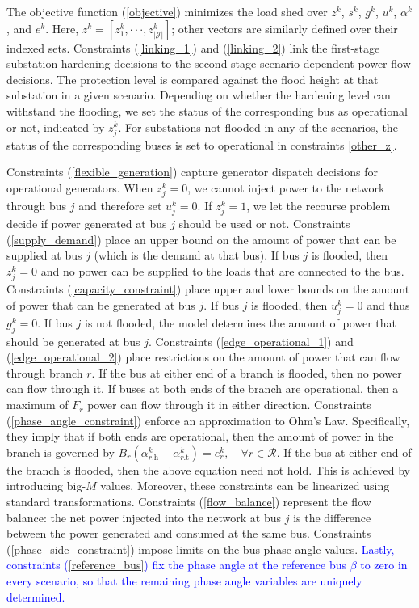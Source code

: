 \documentclass[authoryear,preprint,review,12pt]{elsarticle}\usepackage{amssymb}
\begin{document}
The objective function (\ref{objective}) minimizes the load shed over $z^k$, $s^k$, $g^k$, $u^k$, $\alpha^k$, and $e^k$. Here, $z^k = [z_1^k, \cdot \cdot \cdot, z_{|\mathcal{J}|}^k]$; other vectors are similarly defined over their indexed sets. Constraints (\ref{linking_1}) and (\ref{linking_2}) link the first-stage substation hardening decisions to the second-stage scenario-dependent power flow decisions. The protection level is compared against the flood height at that substation in a given scenario. Depending on whether the hardening level can withstand the flooding, we set the status of the corresponding bus as operational or not, indicated by $z_{j}^k$. For substations not flooded in any of the scenarios, the status of the corresponding buses is set to operational in constraints \eqref{other_z}.

Constraints (\ref{flexible_generation}) capture generator dispatch decisions for operational generators. When $z_{j}^k = 0$, we cannot inject power to the network through bus $j$ and therefore set $u_{j}^k = 0$. If $z_{j}^k = 1$, we let the recourse problem decide if power generated at bus $j$ should be used or not. Constraints (\ref{supply_demand}) place an upper bound on the amount of power that can be supplied at bus $j$ (which is the demand at that bus). If bus $j$ is flooded, then $z_{j}^k = 0$ and no power can be supplied to the loads that are connected to the bus. Constraints (\ref{capacity_constraint}) place upper and lower bounds on the amount of power that can be generated at bus $j$. If bus $j$ is flooded, then $u_{j}^k = 0$ and thus $g_{j}^k = 0$. If bus $j$ is not flooded, the model determines the amount of power that should be generated at bus $j$. Constraints (\ref{edge_operational_1}) and (\ref{edge_operational_2}) place restrictions on the amount of power that can flow through branch $r$. If the bus at either end of a branch is flooded, then no power can flow through it. If buses at both ends of the branch are operational, then a maximum of $F_r$ power can flow through it in either direction. Constraints (\ref{phase_angle_constraint}) enforce an approximation to Ohm's Law. Specifically, they imply that if both ends are operational, then the amount of power in the branch is governed by 
$B_r (\alpha_{r.\mathrm{h}}^k - \alpha_{r.\mathrm{t}}^k) = e_{r}^k, \quad \forall r \in \mathcal{R}.$ If the bus at either end of the branch is flooded, then the above equation need not hold. This is achieved by introducing big-$M$ values. Moreover, these constraints can be linearized using standard transformations. Constraints (\ref{flow_balance}) represent the flow balance: the net power injected into the network at bus $j$ is the difference between the power generated and consumed at the same bus. Constraints (\ref{phase_side_constraint}) impose limits on the bus phase angle values. 
\textcolor{blue}{Lastly, constraints (\ref{reference_bus}) fix the phase angle at the reference bus $\beta$ to zero in every scenario, so that the remaining phase angle variables are uniquely determined.} 
\end{document}
